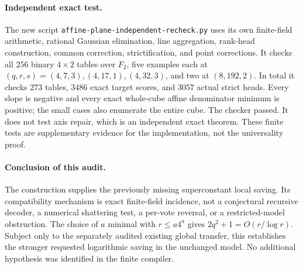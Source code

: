 \documentclass[11pt]{article}
\begin{document}
\paragraph{Independent exact test.}
The new script \texttt{affine-plane-independent-recheck.py} uses its own
finite-field arithmetic, rational Gaussian elimination, line aggregation,
rank-head construction, common correction, strictification, and point
corrections. It checks all $256$ binary $4\times2$ tables over $F_2$,
five examples each at $(q,r,s)=(4,7,3),(4,17,1),(4,32,3)$, and two at
$(8,192,2)$. In total it checks $273$ tables, $3486$ exact target scores,
and $3057$ actual strict heads. Every slope is negative and every exact
whole-cube affine denominator minimum is positive; the small cases also
enumerate the entire cube. The checker passed. It does not test axis
repair, which is an independent exact theorem. These finite tests are
supplementary evidence for the implementation, not the universality proof.

\paragraph{Conclusion of this audit.}
The construction supplies the previously missing superconstant local
saving. Its compatibility mechanism is exact finite-field incidence, not
a conjectural recursive decoder, a numerical shattering test, a
per-vote reversal, or a restricted-model obstruction. The choice of
$a$ minimal with $r\leq a4^a$ gives $2q^2+1=O(r/\log r)$.
Subject only to the separately audited existing global transfer, this
establishes the stronger requested logarithmic saving in the unchanged
model. No additional hypothesis was identified in the finite compiler.
\end{document}
